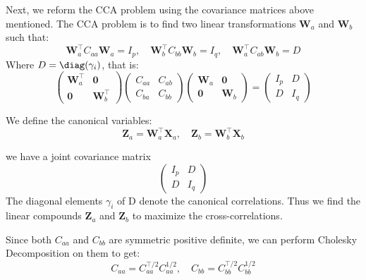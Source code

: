 Next, we reform the CCA problem using the covariance matrices above mentioned. The CCA problem is to find two linear transformations $\mathbf{W}_a$ and $\mathbf{W}_b$ such that:
\begin{equation}
     \mathbf{W}_a^\top C_{aa} \mathbf{W}_a = I_p, \quad  \mathbf{W}_b^\top C_{bb} \mathbf{W}_b = I_q, \quad  \mathbf{W}_a^\top C_{ab}  \mathbf{W}_b = D
\end{equation}
Where $D=\diag (\gamma_i)$, that is:
\begin{equation}
\begin{pmatrix}
     \mathbf{W}_a^\top & {\mathbf 0}\\
    {\mathbf 0} &  \mathbf{W}_b^\top
    \end{pmatrix}
    \begin{pmatrix}
    C_{aa} & C_{ab}\\
    C_{ba} & C_{bb}
    \end{pmatrix}
    \begin{pmatrix}
     \mathbf{W}_a & {\mathbf 0}\\
    {\mathbf 0} &  \mathbf{W}_b
    \end{pmatrix}
    =
    \begin{pmatrix}
    I_p & D\\
    D & I_q
\end{pmatrix}
\end{equation}


We define the canonical variables:
\begin{equation}
    \mathbf{Z}_a= \mathbf{W}_a^\top \mathbf{X}_a, \quad \mathbf{Z}_b = \mathbf{W}_b^\top \mathbf{X}_b
\end{equation}

we have a joint covariance matrix
\begin{equation}
    \begin{pmatrix}
    I_p & D \\
    D & I_q
    \end{pmatrix}
\end{equation}
The diagonal elements $\gamma_i$ of D denote the canonical correlations. Thus we find the linear compounds $\mathbf{Z}_a$ and $\mathbf{Z}_b$ to maximize the cross-correlations. 

Since both $C_{aa}$ and $C_{bb}$ are symmetric positive definite, we can perform Cholesky Decomposition on them to get:
\begin{equation}
    C_{aa} = C_{aa}^{\top/2} C_{aa}^{1/2}, \quad C_{bb} = C_{bb}^{\top/2} C_{bb}^{1/2}
\end{equation}

